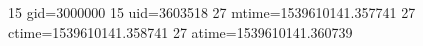 15 gid=3000000
15 uid=3603518
27 mtime=1539610141.357741
27 ctime=1539610141.358741
27 atime=1539610141.360739
